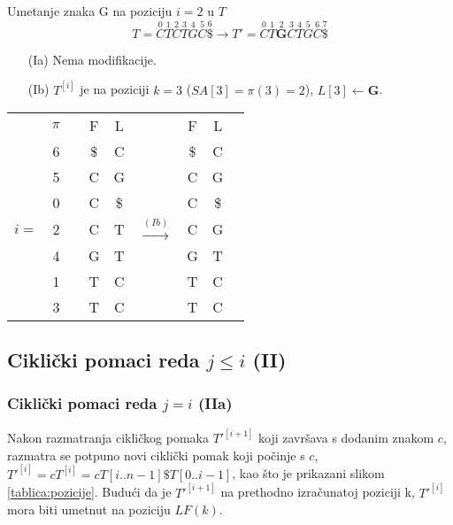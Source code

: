\documentclass{ferseminar}
\begin{document}
\begin{minipage}{0.5\textwidth}
\footnotesize
Umetanje znaka G na poziciju $i=2$ u $T$
$$
	T=\overset{0}{C}	\overset{1}{T} \overset{2}{C} \overset{3}{T}	\overset{4}{G}
	\overset{5}{C}	\overset{6}{\$} \rightarrow		
	T'=\overset{0}{C}	\overset{1}{T}	\overset{2}{\boldsymbol{G}}  \overset{3}{C} \overset{4}{T}	\overset{5}{G}
	\overset{6}{C}	\overset{7}{\$} 	
$$
\begin{itemize}
  \item[(Ia)] Nema modifikacije.
  \item[(Ib)] $T^{[i]}$ je na poziciji $k=3$ ($SA[3]=\pi(3)=2$), $L[3]\leftarrow \boldsymbol{G}$.
\end{itemize}
\end{minipage} \hfill
\begin{minipage}{0.45\textwidth}
\begin{tabular}{cccc|ccc|cc}
	& $\pi$ &  & F & L & & F & L \\
	\cline{2-2} \cline{4-5} \cline{7-8}
	& 6 & & \$ & C & & \$ & C \\
	& 5 & & C & G & & C & G \\
	& 0 & & C & \$ & & C & \$ \\
	\cline{1-8}
	\multicolumn{1}{|c}{$i=$}& 2 & & C & T & $\stackrel{(Ib)}{\longrightarrow}$ & C & \multicolumn{1}{c|}{G} \\
	\cline{1-8}
	& 4 & & G & T & & G & T \\
	& 1 & & T & C & & T & C \\
	& 3 & & T & C & & T & C 
\end{tabular}

\end{minipage}


\subsection{Ciklički pomaci reda $j\leq i$ (II)}

\subsubsection{Ciklički pomaci reda $j=i$ (IIa)}
Nakon razmatranja cikličkog pomaka $T'^{[i+1]}$ koji završava s dodanim znakom $c$, razmatra se potpuno novi ciklički pomak koji počinje s $c$, $T'^{[i]}=cT^{[i]}=cT[i..n-1]\$T[0..i-1]$, kao što je prikazani slikom \ref{tablica:pozicije}. Budući da je $T'^{[i+1]}$ na prethodno izračunatoj poziciji k, $T'^[i]$ mora biti umetnut na poziciju $LF(k)$.
\end{document}

